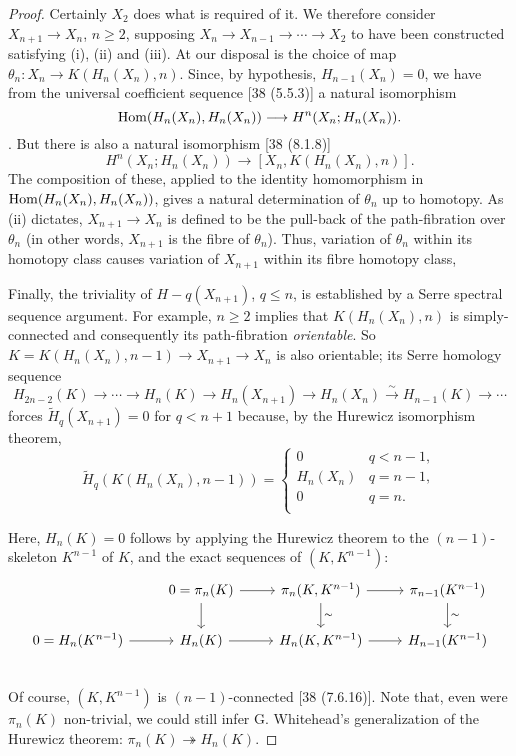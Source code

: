 \begin{proof}
Certainly  $X_2$ does what is required of it. We therefore consider $X_{n+1} \rightarrow X_n$, $n \geqslant 2$, supposing $X_n \longrightarrow X_{n-1} \longrightarrow \cdots \longrightarrow X_2$ to have been constructed satisfying (i), (ii) and (iii). At our
disposal is the choice of map $\theta_n \colon   X_n \longrightarrow K(H_n(X_n), n)$. Since, by hypothesis, $H_{n-1}(X_n) = 0$, we have from the universal coefficient sequence [38 (5.5.3)] a natural isomorphism
\[\mathop{\mathrm{Hom}}(H_n(X_n),H_n(X_n))\longrightarrow H^n(X_n;H_n(X_n)).\]. 
But there is also a natural isomorphism [38 (8.1.8)] 
\[H^n(X_n;H_n(X_n))\longrightarrow [X_n,K(H_n(X_n), n)] .\]
The composition of these, applied to the identity homomorphism in $\mathop{\mathrm{Hom}}(H_n(X_n), H_n(X_n))$, gives a natural determination of $\theta_n$ up to homotopy. As (ii) dictates, $X_{n+1} \longrightarrow X_n$ is defined to be the pull-back of the path-fibration over $\theta_n$ (in other words, $X_{n+1}$ is the fibre of $\theta_n$). Thus, variation of $\theta_n$ within its homotopy class causes variation of $X_{n+1}$ within its fibre homotopy class,

Finally, the triviality of $H-q(X_{n+1})$, $q \leqslant n$, is established by a Serre spectral sequence argument. For example, $n \geqslant 2$ implies that $K(H_n(X_n), n)$ is simply-connected and consequently its path-fibration {\em orientable}. So $K = K(H_n(X_n), n-1) \longrightarrow X_{n+1} \longrightarrow X_n$ is also orientable; its Serre homology
sequence 
\[H_{2n-2}(K) \longrightarrow \cdots \longrightarrow H_n(K) \longrightarrow  H_n(X_{n+1}) \longrightarrow  H_n(X_n) \overset{\sim}{\longrightarrow}  H_{n-1}(K)\longrightarrow  \cdots\]
forces $\widetilde{H}_q (X_{n+1}) = 0$ for $q < n+1$ because, by the Hurewicz isomorphism theorem,
\begin{equation*}
\widetilde{H}_q(K(H_n(X_n),n-1))=
\begin{cases}
0 &q<n-1,\\
H_n(X_n)&q=n-1,\\
0 & q=n.\\
\end{cases}
\end{equation*}

Here, $H_n(K) = 0$ follows by applying the Hurewicz theorem to the $(n-1)$-skeleton $K^{n-1}$ of $K$, and the exact sequences of $(K, K^{n-1})$:
\[
\begin{tikzcd}
               &   0=\pi_{n}(K)  \arrow[r] \arrow[d] &   \pi_{n}(K,K^{n-1}) \arrow[r] \arrow[d,"\sim"] &  \pi_{n-1}(K^{n-1}) \arrow[d,"\sim"]  \\
  0=H_n(K^{n-1})  \arrow[r]  &  H_{n}(K)  \arrow[r]   &  H_{n}(K,K^{n-1})    \arrow[r] & H_{n-1}(K^{n-1})  \\
\end{tikzcd}
\]
Of course, $(K, K^{n-1})$ is $(n-1)$-connected [38 (7.6.16)]. Note that, even were $\pi_n(K)$ non-trivial, we could still infer G. Whitehead's generalization of the Hurewicz theorem: $\pi_n(K) \twoheadrightarrow H_n(K)$.
\end{proof}

